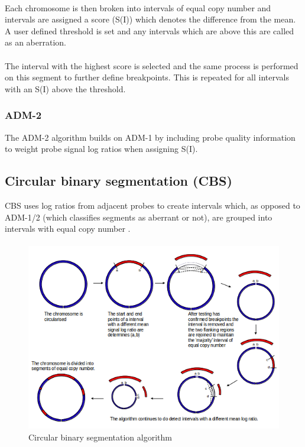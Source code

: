 \paragraph*{}
Each chromosome is then broken into intervals of equal copy number and intervals are assigned a score (S(I)) which denotes the difference from the mean. A user defined threshold is set and any intervals which are above this are called as an aberration.
\paragraph*{}
The interval with the highest score is selected and the same process is performed on this segment to further define breakpoints. This is repeated for all intervals with an S(I) above the threshold.
\subsubsection{ADM-2}
The ADM-2 algorithm builds on ADM-1 by including probe quality information to weight probe signal log ratios when assigning S(I).

\subsection{Circular binary segmentation (CBS)}
\ac{CBS} uses log ratios from adjacent probes to create intervals which, as opposed to ADM-1/2 (which classifies segments as aberrant or not), are grouped into intervals with equal copy number \cite{venkatraman2007}. 
\paragraph*{}
\begin{figure}[h]
\centering
\includegraphics[width=1\linewidth]{./Figures/CBS}
\caption{Circular binary segmentation algorithm}
\label{fig:CBS}
\end{figure}

